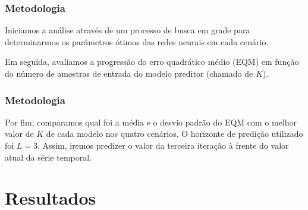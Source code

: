 \documentclass[aspectratio=169]{beamer}
\begin{document}
\begin{frame}
\frametitle{Metodologia}
\justifying Iniciamos a análise através de um processo de busca em grade para determinarmos os parâmetros ótimos das redes neurais em cada cenário. 

Em seguida, avaliamos a progressão do erro quadrático médio (EQM) em função do número de amostras de entrada do modelo preditor (chamado de $K$). 
\end{frame}

\begin{frame}
\frametitle{Metodologia}
\justifying Por fim, comparamos qual foi a média e o desvio padrão do EQM com o melhor valor de $K$ de cada modelo nos quatro cenários. O horizonte de predição utilizado foi $L=3$. Assim, iremos predizer o valor da terceira iteração à frente do valor atual da série temporal.
\end{frame}

\section{Resultados}
\end{document}
